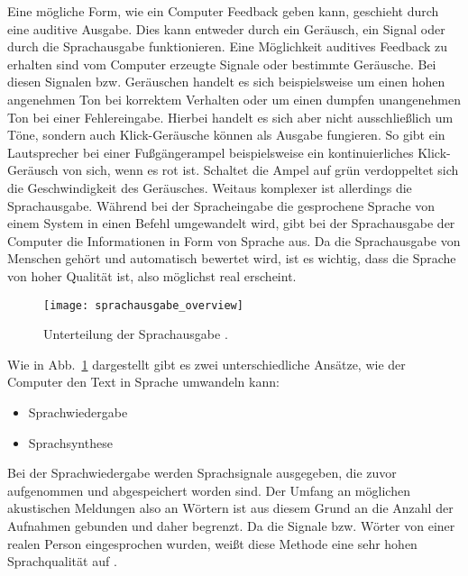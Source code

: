 Eine mögliche Form, wie ein Computer Feedback geben kann, geschieht durch eine auditive Ausgabe. Dies kann entweder durch ein Geräusch, ein Signal oder durch die Sprachausgabe funktionieren.
\newline \newline
Eine Möglichkeit auditives Feedback zu erhalten sind vom Computer erzeugte Signale oder bestimmte Geräusche. Bei diesen Signalen bzw. Geräuschen handelt es sich beispielsweise um einen hohen angenehmen Ton bei korrektem Verhalten oder um einen dumpfen unangenehmen Ton bei einer Fehlereingabe. Hierbei handelt es sich aber nicht ausschließlich um Töne, sondern auch Klick-Geräusche können als Ausgabe fungieren. So gibt ein Lautsprecher bei einer Fußgängerampel beispielsweise ein kontinuierliches Klick-Geräusch von sich, wenn es rot ist. Schaltet die Ampel auf grün verdoppeltet sich die Geschwindigkeit des Geräusches.
\newline \newline
Weitaus komplexer ist allerdings die Sprachausgabe. Während bei der Spracheingabe die gesprochene Sprache von einem System in einen Befehl umgewandelt wird, gibt bei der Sprachausgabe der Computer die Informationen in Form von Sprache aus. Da die Sprachausgabe von Menschen gehört und automatisch bewertet wird, ist es wichtig, dass die Sprache von hoher Qualität ist, also möglichst real erscheint. 
\newline
\begin{figure}
\centering
\texttt{[image: sprachausgabe\_overview]}
\caption{Unterteilung der Sprachausgabe \cite{FellbaumSprache}.}
\label{fig:SprachausgabeOverview}
\end{figure}
%	
Wie in Abb.~\ref{fig:SprachausgabeOverview} dargestellt gibt es zwei unterschiedliche Ansätze, wie der Computer den Text in Sprache umwandeln kann:
\begin{itemize}
      \item Sprachwiedergabe
      \item Sprachsynthese
\end{itemize}
\vspace{\baselineskip}
\vspace{\baselineskip}
Bei der Sprachwiedergabe werden Sprachsignale ausgegeben, die zuvor aufgenommen und abgespeichert worden sind. Der Umfang an möglichen akustischen Meldungen also an Wörtern ist aus diesem Grund an die Anzahl der Aufnahmen gebunden und daher begrenzt. Da die Signale bzw. Wörter von einer realen Person eingesprochen wurden, weißt diese Methode eine sehr hohen Sprachqualität auf \cite{KaufmannPfisterSprache}.
